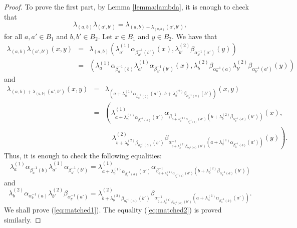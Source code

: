 \begin{proof}
	To prove the first part, by Lemma \ref{lemma:lambda}, it is enough to check that
	$$\lambda_{(a,b)}\lambda_{(a',b')}=\lambda_{(a,b)+\lambda_{(a,b)}(a',b')},$$
	for all $a,a'\in B_1$ and $b,b'\in B_2$. Let $x\in B_1$ and $y\in B_2$. We have that
	\begin{eqnarray*}
		\lambda_{(a,b)}\lambda_{(a',b')}(x,y)&=&\lambda_{(a,b)}\left( \lambda^{(1)}_{a'}\alpha_{\beta^{-1}_{a'}(b')}(x), \lambda^{(2)}_{b'}\beta_{\alpha^{-1}_{b'}(a')}(y)\right)\\
		&=&\left( \lambda^{(1)}_{a}\alpha_{\beta^{-1}_{a}(b)}\lambda^{(1)}_{a'}\alpha_{\beta^{-1}_{a'}(b')}(x), \lambda^{(2)}_{b}\beta_{\alpha^{-1}_{b}(a)}\lambda^{(2)}_{b'}\beta_{\alpha^{-1}_{b'}(a')}(y)\right)
	\end{eqnarray*}	
and
	\begin{eqnarray*}
	\lambda_{(a,b)+\lambda_{(a,b)}(a',b')}(x,y)&=&\lambda_{(a+\lambda^{(1)}_{a}\alpha_{\beta^{-1}_{a}(b)}(a'),b+\lambda^{(2)}_{b}\beta_{\alpha^{-1}_{b}(a)}(b'))}(x,y)\\
	&=&\left( \lambda^{(1)}_{a+\lambda^{(1)}_{a}\alpha_{\beta^{-1}_{a}(b)}(a')}\alpha_{\beta^{-1}_{a+\lambda^{(1)}_{a}\alpha_{\beta^{-1}_{a}(b)}(a')}(b+\lambda^{(2)}_{b}\beta_{\alpha^{-1}_{b}(a)}(b'))}(x),\right.\\
	&&\quad\left. \lambda^{(2)}_{b+\lambda^{(2)}_{b}\beta_{\alpha^{-1}_{b}(a)}(b')}\beta_{\alpha^{-1}_{b+\lambda^{(2)}_{b}\beta_{\alpha^{-1}_{b}(a)}(b')}(a+\lambda^{(1)}_{a}\alpha_{\beta^{-1}_{a}(b)}(a'))}(y)\right).
\end{eqnarray*}	
Thus, it is enough to check the following equalities:
\begin{equation}\label{eq:matched1}
	\lambda^{(1)}_{a}\alpha_{\beta^{-1}_{a}(b)}\lambda^{(1)}_{a'}\alpha_{\beta^{-1}_{a'}(b')}=\lambda^{(1)}_{a+\lambda^{(1)}_{a}\alpha_{\beta^{-1}_{a}(b)}(a')}\alpha_{\beta^{-1}_{a+\lambda^{(1)}_{a}\alpha_{\beta^{-1}_{a}(b)}(a')}(b+\lambda^{(2)}_{b}\beta_{\alpha^{-1}_{b}(a)}(b'))}
\end{equation}
and
\begin{equation}\label{eq:matched2}
	\lambda^{(2)}_{b}\alpha_{\alpha^{-1}_{b}(a)}\lambda^{(2)}_{b'}\beta_{\alpha^{-1}_{b'}(a')}=\lambda^{(2)}_{b+\lambda^{(2)}_{b}\beta_{\alpha^{-1}_{b}(a)}(b')}\beta_{\alpha^{-1}_{b+\lambda^{(2)}_{b}\beta_{\alpha^{-1}_{b}(a)}(b')}(a+\lambda^{(1)}_{a}\alpha_{\beta^{-1}_{a}(b)}(a'))}.
\end{equation}
We shall prove (\ref{eq:matched1}). The equality (\ref{eq:matched2}) is proved similarly. 

\end{proof}
